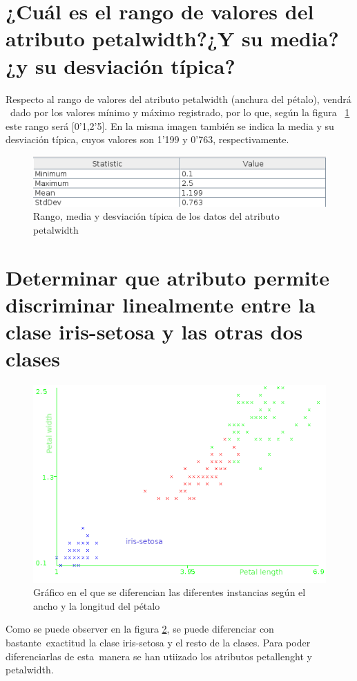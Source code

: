 \documentclass[11pt,twoside,a4paper]{book}
\begin{document}
\section{¿Cuál es el rango de valores del atributo petalwidth?¿Y su media? ¿y su desviación típica?}
Respecto al rango de valores del atributo petalwidth (anchura del pétalo), vendrá \
dado por los valores mínimo y máximo registrado, por lo que, según la figura \
\ref{Fig2} este rango será [0'1,2'5]. En la misma imagen también se indica la media y su desviación típica, cuyos valores son  1'199 y 0'763, respectivamente.
\begin{figure}[H]
	\includegraphics[width=\textwidth]{petalwidth.png}
	\caption{Rango, media y desviación típica de los datos del atributo petalwidth}
	\label{Fig2}
\end{figure}

\section{Determinar que atributo permite discriminar linealmente entre la clase iris-setosa y las otras dos clases}
\begin{figure}[H]
	\includegraphics[width=\textwidth]{Plot.png}
	\caption{Gráfico en el que se diferencian las diferentes instancias según el ancho y la longitud del pétalo}
	\label{Fig3}
\end{figure}
Como se puede observer en la figura \ref{Fig3}, se puede diferenciar con bastante\
exactitud la clase iris-setosa y el resto de la clases. Para poder diferenciarlas de esta\
manera se han utiizado los atributos petallenght y petalwidth.
\end{document}
